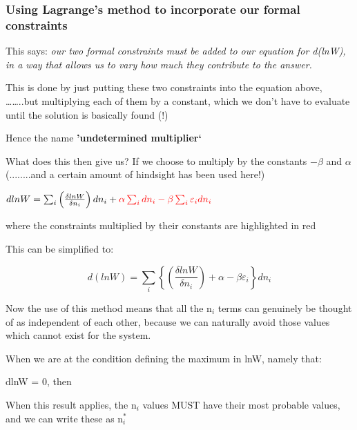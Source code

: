 \documentclass[ignorenonframetext]{beamer}
\begin{document}
\begin{frame}
\frametitle{Using Lagrange's method to incorporate our formal constraints}
This says: \textit{our two formal constraints must be added to our equation for d(lnW), in a way that allows us to vary how much they contribute to the answer. }\par\medskip
 
This is done by just putting these two constraints into the equation above, ……..but multiplying each of them by a constant, which we don't have to evaluate until the solution is basically found (!)\par\medskip
 Hence the name \textbf{'undetermined multiplier‘}\par

What does this then give us? If we choose to multiply by the constants
\(-\beta\) and \(\alpha\) (........and a certain amount of hindsight has been used here!)\par\medskip
 
\(dlnW  = \sum_i \left( \frac{\delta lnW}{\delta n_i}\right) dn_i +  \textcolor{red}{\alpha \sum_i dn_i  -  \beta \sum_i \varepsilon_i  dn_i}\)           

where the constraints multiplied by their constants are highlighted in red
\end{frame}

\begin{frame}[allowframebreaks]
This can be simplified to:\par\bigskip
 
\[d(lnW)  = \sum_i \left\{\left(\frac{\delta lnW}{\delta n_i}\right)   +  \alpha  -  \beta \varepsilon_i \right\} dn_i \]
  
Now the use of this method means that all the n\(_i\) terms can genuinely be thought of as independent of each other, because we can naturally avoid those values which cannot exist for the system.\par\bigskip

When we are at the condition defining the maximum in lnW, namely that:\par

dlnW  =  0, then
\begin{center}
\end{center}
When this result applies, the n\(_i\) values MUST have their most probable values, and we can write these as n\(_i^*\)
\end{frame}
\end{document}
